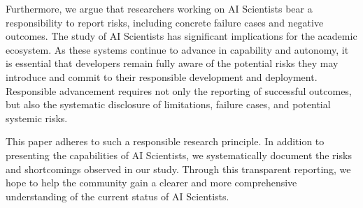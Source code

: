 Furthermore, we argue that researchers working on AI Scientists bear a responsibility to report risks, including concrete failure cases and negative outcomes. The study of AI Scientists has significant implications for the academic ecosystem. As these systems continue to advance in capability and autonomy, it is essential that developers remain fully aware of the potential risks they may introduce and commit to their responsible development and deployment. Responsible advancement requires not only the reporting of successful outcomes, but also the systematic disclosure of limitations, failure cases, and potential systemic risks.

This paper adheres to such a responsible research principle. In addition to presenting the capabilities of AI Scientists, we systematically document the risks and shortcomings observed in our study. Through this transparent reporting, we hope to help the community gain a clearer and more comprehensive understanding of the current status of AI Scientists.